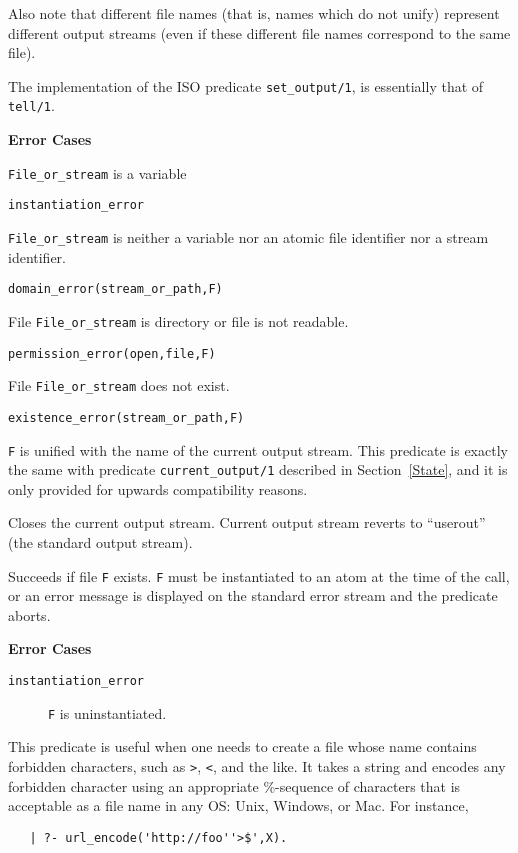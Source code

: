 \begin{description}
    Also note that different file names (that is, names which do not unify) 
    represent different output streams (even if these different file names 
    correspond to the same file).

    The implementation of the ISO predicate {\tt set\_output/1}, is
    essentially that of {\tt tell/1}.

{\bf Error Cases}
\bi
\item  {\tt File\_or\_stream} is  a variable
\bi
\item {\tt instantiation\_error}
\ei
\item {\tt File\_or\_stream} is neither a variable nor an atomic file identifier nor
  a stream identifier.
\bi
\item {\tt domain\_error(stream\_or\_path,F)}
\ei
\item File {\tt File\_or\_stream} is directory or file is not readable. 
\bi
\item {\tt permission\_error(open,file,F)}
\ei
\item File {\tt File\_or\_stream} does not exist. 
\bi
\item {\tt existence\_error(stream\_or\_path,F)}
\ei
\ei

    {\tt F} is unified with the name of the current output stream.
    This predicate is exactly the same with predicate {\tt current\_output/1}
    described in Section~\ref{State}, and it is only provided for
    upwards compatibility reasons.

    Closes the current output stream. 
    Current output stream reverts to ``userout'' (the standard output stream).

    Succeeds if file {\tt F} exists. {\tt F} must be instantiated to
    an atom at the time of the call, or an error message is displayed on
    the standard error stream and the predicate aborts.

{\bf Error Cases}
    \begin {description}
    \item[{\tt instantiation\_error}]
	{\tt F} is uninstantiated.
    \end{description}

   This predicate is useful when one needs to create a file whose name
   contains forbidden characters, such as \texttt{>}, \texttt{<}, and the
   like. It takes a string and encodes any forbidden character
   using an appropriate \%-sequence of characters that is acceptable as a
   file name in any OS: Unix, Windows, or Mac.
   For instance, 
\begin{verbatim}
   | ?- url_encode('http://foo''>$',X).


\end{verbatim}
\end{description}
